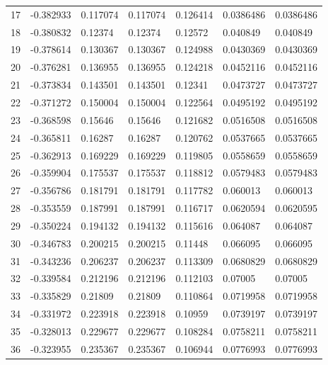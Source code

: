 \begin{longtable}{l|lll|lll}
  17 & -0.382933    & 0.117074    & 0.117074    &  0.126414    & 0.0386486   & 0.0386486   \\
  18 & -0.380832    & 0.12374     & 0.12374     &  0.12572     & 0.040849    & 0.040849    \\
  19 & -0.378614    & 0.130367    & 0.130367    &  0.124988    & 0.0430369   & 0.0430369   \\
  20 & -0.376281    & 0.136955    & 0.136955    &  0.124218    & 0.0452116   & 0.0452116   \\
  21 & -0.373834    & 0.143501    & 0.143501    &  0.12341     & 0.0473727   & 0.0473727   \\
  22 & -0.371272    & 0.150004    & 0.150004    &  0.122564    & 0.0495192   & 0.0495192   \\
  23 & -0.368598    & 0.15646     & 0.15646     &  0.121682    & 0.0516508   & 0.0516508   \\
  24 & -0.365811    & 0.16287     & 0.16287     &  0.120762    & 0.0537665   & 0.0537665   \\
  25 & -0.362913    & 0.169229    & 0.169229    &  0.119805    & 0.0558659   & 0.0558659   \\
  26 & -0.359904    & 0.175537    & 0.175537    &  0.118812    & 0.0579483   & 0.0579483   \\
  27 & -0.356786    & 0.181791    & 0.181791    &  0.117782    & 0.060013    & 0.060013    \\
  28 & -0.353559    & 0.187991    & 0.187991    &  0.116717    & 0.0620594   & 0.0620595   \\
  29 & -0.350224    & 0.194132    & 0.194132    &  0.115616    & 0.064087    & 0.064087    \\
  30 & -0.346783    & 0.200215    & 0.200215    &  0.11448     & 0.066095    & 0.066095    \\
  31 & -0.343236    & 0.206237    & 0.206237    &  0.113309    & 0.0680829   & 0.0680829   \\
  32 & -0.339584    & 0.212196    & 0.212196    &  0.112103    & 0.07005     & 0.07005     \\
  33 & -0.335829    & 0.21809     & 0.21809     &  0.110864    & 0.0719958   & 0.0719958   \\
  34 & -0.331972    & 0.223918    & 0.223918    &  0.10959     & 0.0739197   & 0.0739197   \\
  35 & -0.328013    & 0.229677    & 0.229677    &  0.108284    & 0.0758211   & 0.0758211   \\
  36 & -0.323955    & 0.235367    & 0.235367    &  0.106944    & 0.0776993   & 0.0776993   \\

\end{longtable}

